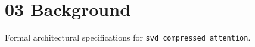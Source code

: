 \section{03 Background}

Formal architectural specifications for \texttt{svd_compressed_attention}.
